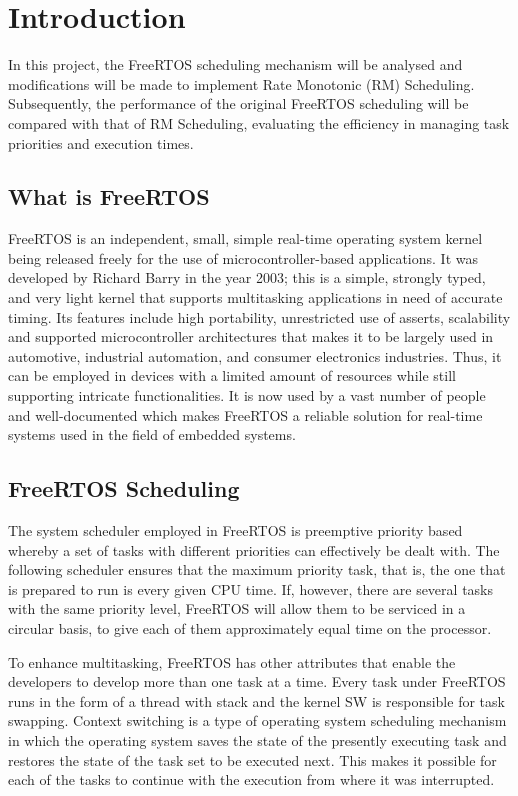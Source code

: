 \section{Introduction}
In this project, the FreeRTOS scheduling mechanism will be analysed and modifications will be made to implement Rate Monotonic (RM) Scheduling. Subsequently, the performance of the original FreeRTOS scheduling will be compared with that of RM Scheduling, evaluating the efficiency in managing task priorities and execution times.

\subsection{What is FreeRTOS}
FreeRTOS is an independent, small, simple real-time operating system kernel being released freely for the use of microcontroller-based applications. It was developed by Richard Barry in the year 2003; this is a simple, strongly typed, and very light kernel that supports multitasking applications in need of accurate timing. Its features include high portability, unrestricted use of asserts, scalability and supported microcontroller architectures that makes it to be largely used in automotive, industrial automation, and consumer electronics industries. Thus, it can be employed in devices with a limited amount of resources while still supporting intricate functionalities. It is now used by a vast number of people and well-documented which makes FreeRTOS a reliable solution for real-time systems used in the field of embedded systems.

\subsection{FreeRTOS Scheduling}
The system scheduler employed in FreeRTOS is preemptive priority based whereby a set of tasks with different priorities can effectively be dealt with. The following scheduler ensures that the maximum priority task, that is, the one that is prepared to run is every given CPU time. If, however, there are several tasks with the same priority level, FreeRTOS will allow them to be serviced in a circular basis, to give each of them approximately equal time on the processor. 

\noindent To enhance multitasking, FreeRTOS has other attributes that enable the developers to develop more than one task at a time. Every task under FreeRTOS runs in the form of a thread with stack and the kernel SW is responsible for task swapping. Context switching is a type of operating system scheduling mechanism in which the operating system saves the state of the presently executing task and restores the state of the task set to be executed next. This makes it possible for each of the tasks to continue with the execution from where it was interrupted. 

